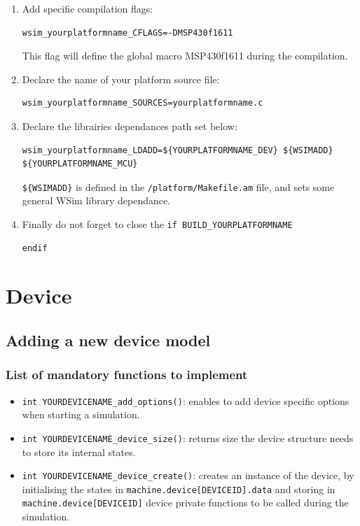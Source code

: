 \documentclass[a4paper,10pt]{report}
\begin{document}
\begin{enumerate}
  \item Add specific compilation flags:
\begin{verbatim}
wsim_yourplatformname_CFLAGS=-DMSP430f1611
\end{verbatim}
This flag will define the global macro MSP430f1611 during the compilation.

  \item Declare the name of your platform source file:
\begin{verbatim}
wsim_yourplatformname_SOURCES=yourplatformname.c
\end{verbatim}

  \item Declare the librairies dependances path set below: 
\begin{verbatim}
wsim_yourplatformname_LDADD=${YOURPLATFORMNAME_DEV} ${WSIMADD} ${YOURPLATFORMNAME_MCU}
\end{verbatim}
\verb!${WSIMADD}! is defined in the \verb$/platform/Makefile.am$ file, and sets some general WSim library dependance.

  \item  Finally do not forget to close the \verb$if BUILD_YOURPLATFORMNAME$
\begin{verbatim}
endif
\end{verbatim}

\end{enumerate}

\section{Device}
\subsection{Adding a new device model}
\subsubsection{List of mandatory functions to implement}
\begin{itemize}
  \item \verb$int YOURDEVICENAME_add_options()$: enables to add device specific options when starting a simulation.
  \item \verb$int YOURDEVICENAME_device_size()$: returns size the device structure needs to store its internal states.
  \item \verb$int YOURDEVICENAME_device_create()$: creates an instance of the device, by initialising the states in \verb$machine.device[DEVICEID].data$ and storing in \verb$machine.device[DEVICEID]$ device private functions to be called during the simulation.
\end{itemize}
\end{document}

